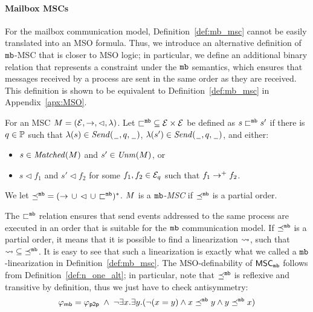 \paragraph{\bf Mailbox MSCs}
For the mailbox communication model, Definition~\ref{def:mb_msc} cannot be easily translated into an MSO formula. Thus, we introduce an alternative definition of $\mathtt{mb}$-MSC that is closer to MSO logic; in particular, we define an additional binary relation that represents a constraint under the $\mathtt{mb}$ semantics, which ensures that messages received by a process are sent in the same order as they are received. This definition is shown to be equivalent to Definition~\ref{def:mb_msc} in Appendix~\ref{apx:MSO}.

\begin{definition} \label{def:n_one_alt}
	For an MSC $M = (\mathcal{E},\to,\lhd,\lambda)$.	Let ${\sqsubset^{\mathtt{mb}}} \subseteq \mathcal{E} \times \mathcal{E}$
	be defined as $s \sqsubset^{\mathtt{mb}} s'$ if there is $q \in \mathbb{P}$
	such that $\lambda(s) \in {\mathit{Send}(\hspace{0.1em}\underline{\hspace{0.5em}}\hspace{0.1em},q,\hspace{0.1em}\underline{\hspace{0.5em}}\hspace{0.1em})}$,
	$\lambda(s') \in {\mathit{Send}(\hspace{0.1em}\underline{\hspace{0.5em}}\hspace{0.1em},q,\hspace{0.1em}\underline{\hspace{0.5em}}\hspace{0.1em})}$, and either:
	\begin{itemize}%
		\item $s \in \mathit{Matched}(M)$ and $s' \in \mathit{Unm}(M)$, or
		\item $s \lhd f_1$ and $s' \lhd f_2$ for some $f_1,f_2 \in \mathcal{E}_q$ such that $f_1 \to^+ f_2$.
	\end{itemize}

	We let ${\preceq^{\mathtt{mb}}} = ({\to} \,\cup\, {\lhd} \,\cup\, {\sqsubset^{\mathtt{mb}}})^\ast$.
	$M $ is a \emph{$\mathtt{mb}$-MSC}
	if ${\preceq^{\mathtt{mb}}}$ is a partial order.
\end{definition}
The ${\sqsubset^{\mathtt{mb}}}$ relation ensures that send events addressed to the same process are executed in an order that is suitable for the $\mathtt{mb}$ communication model. If ${\preceq^{\mathtt{mb}}}$ is a partial order, it means that it is possible to find a linearization $\rightsquigarrow$, such that $\rightsquigarrow \;\subseteq\; \preceq^{\mathtt{mb}}$. It is easy to see that such a linearization is exactly what we called a $\mathtt{mb}$-linearization in Definition~\ref{def:mb_msc}.
The MSO-definability of $\mathsf{MSC}_{\mathtt{mb}}$ follows from Definition~\ref{def:n_one_alt}; in particular, note that 
$\preceq^{\mathtt{mb}}$ is reflexive and transitive by definition, 
thus we just have to check antisymmetry:
\[
	\varphi_{\mathsf{mb}} = \varphi_{\mathsf{p2p}} \;\wedge\; \neg \exists x.\exists y.(\neg (x = y) \wedge x \preceq^{\mathtt{mb}} y \wedge y \preceq^{\mathtt{mb}} x)
\]

